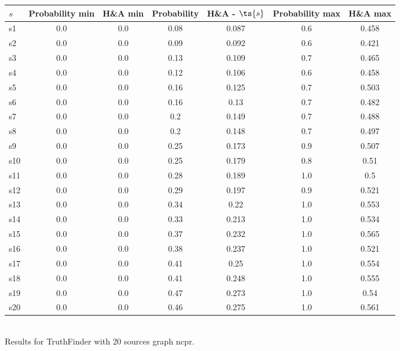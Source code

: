 \documentclass{article}
\begin{document}
\noindent\begin{tabular}{|l|c|c|c|c|c|c|}
\hline
$s$& Probability min & H\&A min & Probability & H\&A - $\ts{s}$ & Probability max & H\&A max\\
\hline
s1 &0.0 & 0.0 & 0.08 & 0.087 & 0.6 & 0.458\\
\hline
s2 &0.0 & 0.0 & 0.09 & 0.092 & 0.6 & 0.421\\
\hline
s3 &0.0 & 0.0 & 0.13 & 0.109 & 0.7 & 0.465\\
\hline
s4 &0.0 & 0.0 & 0.12 & 0.106 & 0.6 & 0.458\\
\hline
s5 &0.0 & 0.0 & 0.16 & 0.125 & 0.7 & 0.503\\
\hline
s6 &0.0 & 0.0 & 0.16 & 0.13 & 0.7 & 0.482\\
\hline
s7 &0.0 & 0.0 & 0.2 & 0.149 & 0.7 & 0.488\\
\hline
s8 &0.0 & 0.0 & 0.2 & 0.148 & 0.7 & 0.497\\
\hline
s9 &0.0 & 0.0 & 0.25 & 0.173 & 0.9 & 0.507\\
\hline
s10 &0.0 & 0.0 & 0.25 & 0.179 & 0.8 & 0.51\\
\hline
s11 &0.0 & 0.0 & 0.28 & 0.189 & 1.0 & 0.5\\
\hline
s12 &0.0 & 0.0 & 0.29 & 0.197 & 0.9 & 0.521\\
\hline
s13 &0.0 & 0.0 & 0.34 & 0.22 & 1.0 & 0.553\\
\hline
s14 &0.0 & 0.0 & 0.33 & 0.213 & 1.0 & 0.534\\
\hline
s15 &0.0 & 0.0 & 0.37 & 0.232 & 1.0 & 0.565\\
\hline
s16 &0.0 & 0.0 & 0.38 & 0.237 & 1.0 & 0.521\\
\hline
s17 &0.0 & 0.0 & 0.41 & 0.25 & 1.0 & 0.554\\
\hline
s18 &0.0 & 0.0 & 0.41 & 0.248 & 1.0 & 0.555\\
\hline
s19 &0.0 & 0.0 & 0.47 & 0.273 & 1.0 & 0.54\\
\hline
s20 &0.0 & 0.0 & 0.46 & 0.275 & 1.0 & 0.561\\
\hline
\end{tabular}\\

\noindent Results for TruthFinder with 20 sources graph ncpr.
\end{document}
